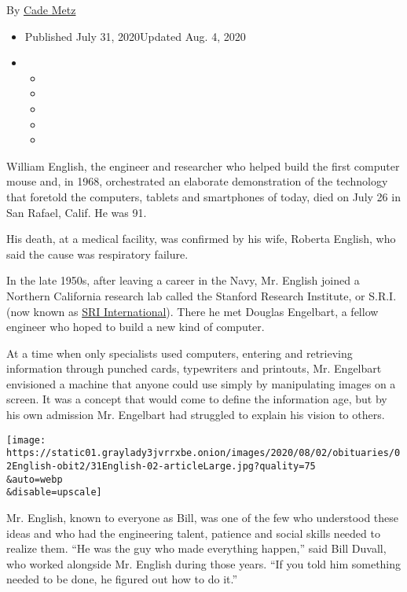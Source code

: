 By \href{https://www.nytimes3xbfgragh.onion/by/cade-metz}{Cade Metz}

\begin{itemize}
\item
  Published July 31, 2020Updated Aug. 4, 2020
\item
  \begin{itemize}
  \item
  \item
  \item
  \item
  \item
  \end{itemize}
\end{itemize}

William English, the engineer and researcher who helped build the first
computer mouse and, in 1968, orchestrated an elaborate demonstration of
the technology that foretold the computers, tablets and smartphones of
today, died on July 26 in San Rafael, Calif. He was 91.

His death, at a medical facility, was confirmed by his wife, Roberta
English, who said the cause was respiratory failure.

In the late 1950s, after leaving a career in the Navy, Mr. English
joined a Northern California research lab called the Stanford Research
Institute, or S.R.I. (now known as \href{https://www.sri.com/}{SRI
International}). There he met Douglas Engelbart, a fellow engineer who
hoped to build a new kind of computer.

At a time when only specialists used computers, entering and retrieving
information through punched cards, typewriters and printouts, Mr.
Engelbart envisioned a machine that anyone could use simply by
manipulating images on a screen. It was a concept that would come to
define the information age, but by his own admission Mr. Engelbart had
struggled to explain his vision to others.

\texttt{[image: https://static01.graylady3jvrrxbe.onion/images/2020/08/02/obituaries/02English-obit2/31English-02-articleLarge.jpg?quality=75\\\&auto=webp\\\&disable=upscale]}

Mr. English, known to everyone as Bill, was one of the few who
understood these ideas and who had the engineering talent, patience and
social skills needed to realize them. ``He was the guy who made
everything happen,'' said Bill Duvall, who worked alongside Mr. English
during those years. ``If you told him something needed to be done, he
figured out how to do it.''

